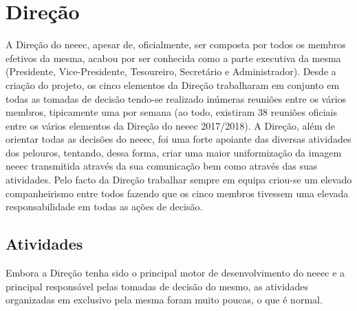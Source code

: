 
\section{Direção}

A Direção do \acrshort{neeec}, apesar de, oficialmente, ser composta por todos os membros efetivos da mesma, acabou por ser conhecida como a parte executiva da mesma (Presidente, Vice-Presidente, Tesoureiro, Secretário e Administrador). Desde a criação do projeto, os cinco elementos da Direção trabalharam em conjunto em todas as tomadas de decisão tendo-se realizado inúmeras reuniões entre os vários membros, tipicamente uma por semana (ao todo, existiram 38 reuniões oficiais entre os vários elementos da Direção do \acrshort{neeec} 2017/2018). A Direção, além de orientar todas as decisões do \acrshort{neeec}, foi uma forte apoiante das diversas atividades dos pelouros, tentando, dessa forma, criar uma maior uniformização da imagem \acrshort{neeec} transmitida através da sua comunicação bem como através das suas atividades. Pelo facto da Direção trabalhar sempre em equipa criou-se um elevado companheirismo entre todos fazendo que os cinco membros tivessem uma elevada responsabilidade em todas as ações de decisão.

\subsection{Atividades}

Embora a Direção tenha sido o principal motor de desenvolvimento do \acrshort{neeec} e a principal responsável pelas tomadas de decisão do mesmo, as atividades organizadas em exclusivo pela mesma foram muito poucas, o que é normal.







